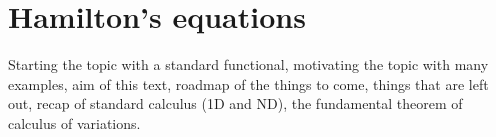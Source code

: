 \section{Hamilton's equations}
Starting the topic with a standard functional, motivating the topic with many examples, aim of this text, roadmap of the things to come, things that are left out, recap of standard calculus (1D and ND), the fundamental theorem of calculus of variations.